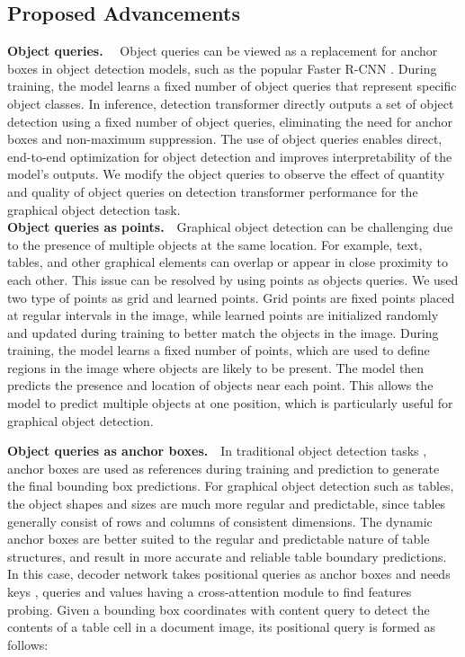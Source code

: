 \documentclass[sn-mathphys]{sn-jnl}\jyear{2021}\theoremstyle{thmstyleone}\newtheorem{theorem}{Theorem}\newtheorem{proposition}[theorem]{Proposition}\theoremstyle{thmstyletwo}\newtheorem{example}{Example}\newtheorem{remark}{Remark}\theoremstyle{thmstylethree}\newtheorem{definition}{Definition}\usepackage{amsmath}
\begin{document}
\subsection{Proposed Advancements}
\noindent\textbf {Object queries.}~~
Object queries can be viewed as a replacement for anchor boxes in object detection models, such as the popular Faster R-CNN \cite{faster23}. During training, the model learns a fixed number of object queries that represent specific object classes. In inference, detection transformer directly outputs a set of object detection using a fixed number of object queries, eliminating the need for anchor boxes and non-maximum suppression. The use of object queries enables direct, end-to-end optimization for object detection and improves interpretability of the model's outputs. We modify the object queries to observe the effect of quantity and quality of object queries on detection transformer performance for the graphical object detection task.\\
\noindent\textbf {Object queries as points.}~~Graphical object detection can be challenging due to the presence of multiple objects at the same location. For example, text, tables, and other graphical elements can overlap or appear in close proximity to each other. This issue can be resolved by using points as objects queries. We used two type of points as grid and learned points. Grid points are fixed points placed at regular intervals in the image, while learned points are initialized randomly and updated during training to better match the objects in the image. During training, the model learns a fixed number of points, which are used to define regions in the image where objects are likely to be present. The model then predicts the presence and location of objects near each point. This allows the model to predict multiple objects at one position, which is particularly useful for graphical object detection.
 
\noindent\textbf {Object queries as anchor boxes.}~~In traditional object detection tasks \cite{faster23, fast5}, anchor boxes are used as references during training and prediction to generate the final bounding box predictions. For graphical object detection such as tables, the object shapes and sizes are much more regular and predictable, since tables generally consist of rows and columns of consistent dimensions. The dynamic anchor boxes are better suited to the regular and predictable nature of table structures, and result in more accurate and reliable table boundary predictions.\\
In this case, decoder network takes positional queries as anchor boxes and needs keys , queries  and values  having a cross-attention module to find features probing. Given a bounding box coordinates  with content query  to detect the contents of a table cell in a document image, its  positional query  is formed as follows:  
\end{document}
